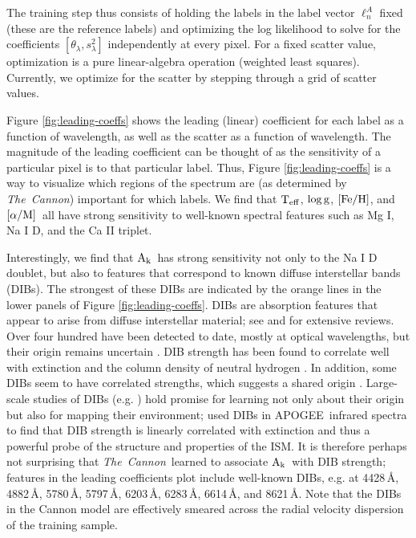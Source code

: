 \documentclass[12pt, letterpaper, preprint]{aastex}
\newcommand{\tc}{\textsl{The~Cannon}}
\newcommand{\apogee}{APOGEE}
\newcommand{\set}[1]{\bm{#1}}
\newcommand{\teff}{\mbox{$\rm T_{eff}$}}
\newcommand{\feh}{\mbox{$\rm [Fe/H]$}}
\newcommand{\alpham}{\mbox{$\rm [\alpha/M]$}}
\newcommand{\logg}{\mbox{$\rm \log g$}}
\newcommand{\ak}{\mbox{$\rm A_k$}}
\newcommand{\starlabel}{\ell}
\newcommand{\starlabelvec}{\set{\starlabel}}
\newcommand{\angstrom}{\mbox{\AA}}
\begin{document}
The training step thus consists of holding the labels in the label vector $\starlabelvec^A_n$ fixed (these are the reference labels) and optimizing the log likelihood to solve for the coefficients 
$[\theta_\lambda, s_\lambda^2]$ independently at every pixel. 
For a fixed scatter value, optimization is a pure linear-algebra operation (weighted least squares). 
Currently, we optimize for the scatter by stepping through a grid of scatter values. 

Figure \ref{fig:leading-coeffs} shows the leading (linear) coefficient for each label as
a function of wavelength, as well as the scatter as a function of wavelength.
The magnitude of the leading coefficient can be thought of as the sensitivity 
of a particular pixel is to that particular label. Thus, Figure \ref{fig:leading-coeffs}
is a way to visualize which regions of the spectrum are (as determined by
\tc) important for which labels. 
We find that \teff, \logg, \feh, and
\alpham\ all have strong
sensitivity to well-known spectral features such as
Mg I, Na I D, and the Ca II triplet. 

Interestingly, we find that \ak\ has strong sensitivity not only to the Na I D doublet, but also to features that correspond
to known diffuse interstellar bands (DIBs).
The strongest of these DIBs are indicated by the
orange lines in the lower panels of
Figure \ref{fig:leading-coeffs}.
DIBs are absorption features that appear to arise from diffuse
interstellar material; see \citet{Sarre2006} and \citet{Herbig1995}
for extensive reviews. 
Over four hundred have been detected to date, mostly at optical
wavelengths, but their origin remains uncertain \citep{Hobbs2008,Herbig1993}.
DIB strength has been found to correlate well with extinction and the column density of neutral hydrogen \citep{Friedman2011}. 
In addition, some DIBs seem to have correlated strengths, which suggests a shared origin \citep{McCall2010,Friedman2011}. 
Large-scale studies of DIBs (e.g. \citet{Yuan2012}) hold promise for learning not only about their origin but also for mapping their environment; \citet{Zasowski2015}
used DIBs in \apogee\ infrared spectra to find that
DIB strength is linearly correlated with extinction and thus a powerful probe of the structure and properties of the ISM.
It is therefore perhaps not surprising that \tc\ learned to associate
\ak\ with DIB strength; features in the leading coefficients plot
include well-known DIBs, e.g. at
4428\,\angstrom, 4882\,\angstrom, 5780\,\angstrom, 
5797\,\angstrom, 6203\,\angstrom, 6283\,\angstrom,
6614\,\angstrom, and 8621\,\angstrom.
Note that the DIBs in the Cannon model are effectively
smeared across the radial velocity dispersion of the training
sample.
\end{document}
